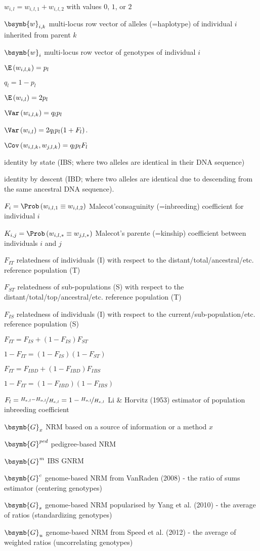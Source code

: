 $w_{i,l} = w_{i,l,1} + w_{i,l,2}$ with values $0$, $1$, or $2$

$\bsymb{w}_{i,k}$ multi-locus row vector of alleles (=haplotype) of individual $i$ inherited from parent $k$

$\bsymb{w}_{i}$ multi-locus row vector of genotypes of individual $i$

$\E\left(w_{i,l,k}\right)=p_l$

$q_l = 1 - p_l$

$\E\left(w_{i,l}\right)=2p_l$

$\Var\left(w_{i,l,k}\right) = q_l p_l$

$\Var\left(w_{i,l}\right) = 2 q_l p_l (1 + F_l)$.

$\Cov\left(w_{i,l,k}, w_{j,l,k}\right) = q_l p_l F_l$

identity by state (IBS; where two alleles are identical in their DNA sequence)

identity by descent (IBD; where two alleles are identical due to descending from the same ancestral DNA sequence).

$F_i = \Prob\left(w_{i,l,1} \equiv w_{i,l,2}\right)$ Malecot'consaguinity (=inbreeding) coefficient for individual $i$

$K_{i,j} = \Prob\left(w_{i,l,*} \equiv w_{j,l,*}\right)$ Malecot's parente (=kinship) coefficient between individuals $i$ and $j$

$F_{IT}$ relatedness of individuals (I) with respect to the distant/total/ancestral/etc. reference population (T)

$F_{ST}$ relatedness of sub-populations (S) with respect to the distant/total/top/ancestral/etc. reference population (T)

$F_{IS}$ relatedness of individuals (I) with respect to the current/sub-population/etc. reference population (S)

$F_{IT} = F_{IS} + (1 - F_{IS}) F_{ST}$

$1 - F_{IT} = \left(1 - F_{IS}\right)\left(1 - F_{ST}\right)$

$F_{IT} = F_{IBD} + (1 - F_{IBD}) F_{IBS}$

$1 - F_{IT} = \left(1 - F_{IBD}\right)\left(1 - F_{IBS}\right)$

$F_l = \nicefrac{H_{e,l} - H_{o,l}}{H_{e,l}} = 1 - \nicefrac{H_{o,l}}{H_{e,l}}$ Li & Horvitz (1953) estimator of population inbreeding coefficient

$\bsymb{G}_{x}$ NRM based on a source of information or a method $x$

$\bsymb{G}^{ped}$ pedigree-based NRM

$\bsymb{G}^{m}$ IBS GNRM

$\bsymb{G}^{c}$ genome-based NRM from VanRaden (2008) - the ratio of sums estimator (centering genotypes)

$\bsymb{G}_{s}$ genome-based NRM popularised by Yang et al. (2010)  - the average of ratios (standardizing genotypes)

$\bsymb{G}_{u}$ genome-based NRM from Speed et al. (2012) - the average of weighted ratios (uncorrelating genotypes)
